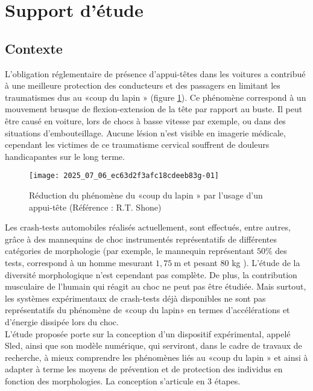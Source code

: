
\section{Support d'étude \label{ccs_mp_2022_sec_1}}
\subsection{Contexte \label{ccs_mp_2022_sec_1A}}
L'obligation réglementaire de présence d'appui-têtes dans les voitures a contribué à une meilleure protection des conducteurs et des passagers en limitant les traumatismes dus au «coup du lapin » (figure \ref{ccs_mp_2022_fig_01}). Ce phénomène correspond à un mouvement brusque de flexion-extension de la tête par rapport au buste. Il peut être causé en voiture, lors de chocs à basse vitesse par exemple, ou dans des situations d'embouteillage. Aucune lésion n'est visible en imagerie médicale, cependant les victimes de ce traumatisme cervical souffrent de douleurs handicapantes sur le long terme.\\

\begin{figure}[!h]
\centering
\texttt{[image: 2025\_07\_06\_ec63d2f3afc18cdeeb83g-01]}

\caption{Réduction du phénomène du «coup du lapin » par l'usage d'un appui-tête (Référence : R.T. Shone) \label{ccs_mp_2022_fig_01}}
\end{figure}

Les crash-tests automobiles réalisés actuellement, sont effectués, entre autres, grâce à des mannequins de choc instrumentés représentatifs de différentes catégories de morphologie (par exemple, le mannequin représentant $50 \%$ des tests, correspond à un homme mesurant $1,75 \mathrm{~m}$ et pesant 80 kg ). L'étude de la diversité morphologique n'est cependant pas complète. De plus, la contribution musculaire de l'humain qui réagit au choc ne peut pas être étudiée. Mais surtout, les systèmes expérimentaux de crash-tests déjà disponibles ne sont pas représentatifs du phénomène de «coup du lapin» en termes d'accélérations et d'énergie dissipée lors du choc.\\
L'étude proposée porte sur la conception d'un dispositif expérimental, appelé Sled, ainsi que son modèle numérique, qui serviront, dans le cadre de travaux de recherche, à mieux comprendre les phénomènes liés au «coup du lapin » et ainsi à adapter à terme les moyens de prévention et de protection des individus en fonction des morphologies. La conception s'articule en 3 étapes.

